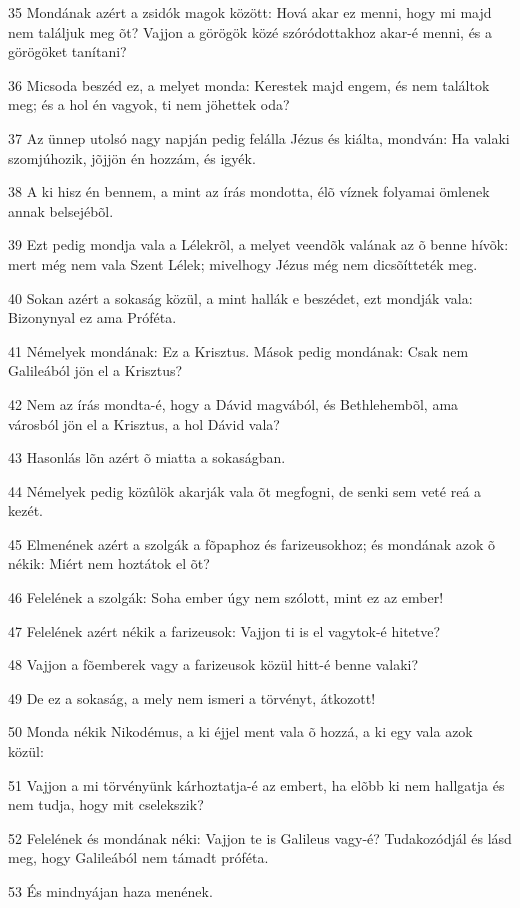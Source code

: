 \par 35 Mondának azért a zsidók magok között: Hová akar ez menni, hogy mi majd nem találjuk meg õt? Vajjon a görögök közé szóródottakhoz akar-é menni, és a görögöket tanítani?
\par 36 Micsoda beszéd ez, a melyet monda: Kerestek majd engem, és nem találtok meg; és a hol én vagyok, ti nem jöhettek oda?
\par 37 Az ünnep utolsó nagy napján pedig felálla Jézus és kiálta, mondván: Ha valaki  szomjúhozik, jõjjön én hozzám, és igyék.
\par 38 A ki hisz én bennem, a mint az írás mondotta, élõ  víznek folyamai ömlenek annak belsejébõl.
\par 39 Ezt pedig mondja vala a Lélekrõl, a melyet veendõk valának az õ benne hívõk: mert még nem vala Szent Lélek; mivelhogy Jézus még nem dicsõítteték meg.
\par 40 Sokan azért a sokaság közül, a mint hallák e beszédet, ezt mondják vala: Bizonynyal ez ama Próféta.
\par 41 Némelyek mondának: Ez a Krisztus. Mások pedig mondának: Csak nem Galileából jön el a Krisztus?
\par 42 Nem az írás mondta-é, hogy a Dávid magvából, és Bethlehembõl, ama városból jön el a Krisztus, a hol Dávid vala?
\par 43 Hasonlás lõn azért õ miatta a sokaságban.
\par 44 Némelyek pedig közûlök akarják vala õt megfogni, de senki sem veté reá a kezét.
\par 45 Elmenének azért a szolgák a fõpaphoz és farizeusokhoz; és mondának azok õ nékik: Miért nem hoztátok el õt?
\par 46 Felelének a szolgák: Soha ember úgy nem szólott, mint ez az ember!
\par 47 Felelének azért nékik a farizeusok: Vajjon ti is el vagytok-é hitetve?
\par 48 Vajjon a fõemberek vagy a farizeusok közül hitt-é benne valaki?
\par 49 De ez a sokaság, a mely nem ismeri a törvényt, átkozott!
\par 50 Monda nékik Nikodémus, a ki éjjel ment vala õ hozzá, a ki egy vala azok közül:
\par 51 Vajjon a mi törvényünk kárhoztatja-é az embert, ha elõbb ki nem hallgatja és nem tudja, hogy mit cselekszik?
\par 52 Felelének és mondának néki: Vajjon te is Galileus vagy-é? Tudakozódjál és lásd meg, hogy Galileából nem támadt próféta.
\par 53 És mindnyájan haza menének.

